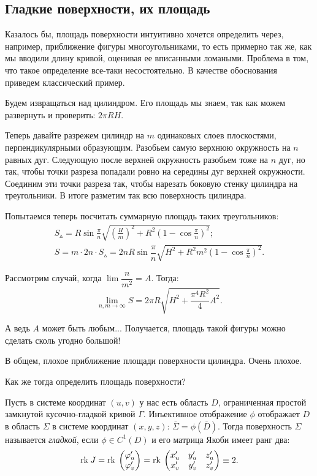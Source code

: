 \subsection{Гладкие поверхности, их площадь}
Казалось бы, площадь поверхности интуитивно хочется определить через, например, приближение фигуры многоугольниками, то есть примерно так же, как мы вводили длину кривой, оценивая ее вписанными ломаными. Проблема в том, что такое определение все-таки несостоятельно. В качестве обоснования приведем классический пример.

\begin{Examples}
Будем извращаться над цилиндром. Его площадь мы знаем, так как можем развернуть и проверить: $2\pi R H$.

Теперь давайте разрежем цилиндр на $m$ одинаковых слоев плоскостями, перпендикулярными образующим. Разобьем самую верхнюю окружность на $n$ равных дуг. Следующую после верхней окружность разобьем тоже на $n$ дуг, но так, чтобы точки
разреза попадали ровно на середины дуг верхней окружности. Соединим эти точки разреза так, чтобы нарезать боковую стенку цилиндра на треугольники. В итоге разметим так всю поверхность цилиндра.

Попытаемся теперь посчитать суммарную площадь таких треугольников:
\begin{gather*}
S_\vartriangle = R \sin \frac{\pi}{n} \sqrt{\left( \frac{H}{m} \right)^2 + R^2 \left( 1 - \cos \frac{\pi}{n} \right)^2};\\
S =  m \cdot 2n \cdot S_\vartriangle = 2n R \sin \dfrac{\pi}{n}\sqrt{H^2 + R^2m^2 \left( 1 - \cos \frac{\pi}{n} \right)^2}.
\end{gather*}

Рассмотрим случай, когда $\lim \dfrac{n}{m^2} = A$. Тогда:
$$
\lim\limits_{n, m \to \infty} S = 2\pi R \sqrt{H^2 + \dfrac{\pi^4 R^2}{4}A^2}.
$$

А ведь $A$ может быть любым... Получается, площадь такой фигуры можно сделать сколь угодно большой!

В общем, плохое приближение площади поверхности цилиндра. Очень плохое.
\end{Examples}

Как же тогда определить площадь поверхности?

\begin{Def}
Пусть в системе координат $(u, v)$ у нас есть область $D$, ограниченная простой замкнутой кусочно-гладкой кривой $\Gamma$. Инъективное отображение $\phi$ отображает $D$ в область $\Sigma$ в системе координат $(x, y, z)$: $\overline\Sigma = \phi(\overline D)$. Тогда поверхность $\Sigma$ называется \textit{гладкой}, если  $\phi \in C^1(D)$ и его матрица Якоби имеет ранг два:
$$
\mathrm{rk}\: J = \mathrm{rk}\: \begin{pmatrix}
\varphi'_u \\ \varphi'_v
\end{pmatrix} = \mathrm{rk}\: \begin{pmatrix}
x'_u & y'_u & z'_u \\
x'_v & y'_v & z'_v
\end{pmatrix} \equiv 2.
$$
\end{Def}

